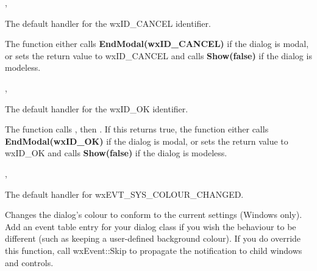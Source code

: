 
, 

\label{wxdialogoncancel}


The default handler for the wxID\_CANCEL identifier.


The function either calls {\bf EndModal(wxID\_CANCEL)} if the dialog is modal, or
sets the return value to wxID\_CANCEL and calls {\bf Show(false)} if the dialog is modeless.


, 

\label{wxdialogonok}


The default handler for the wxID\_OK identifier.


The function calls
\rtfsp{}, then .
If this returns true, the function either calls {\bf EndModal(wxID\_OK)} if the dialog is modal, or
sets the return value to wxID\_OK and calls {\bf Show(false)} if the dialog is modeless.


, 

\label{wxdialogonsyscolourchanged}


The default handler for wxEVT\_SYS\_COLOUR\_CHANGED.




Changes the dialog's colour to conform to the current settings (Windows only).
Add an event table entry for your dialog class if you wish the behaviour
to be different (such as keeping a user-defined
background colour). If you do override this function, call wxEvent::Skip to
propagate the notification to child windows and controls.

